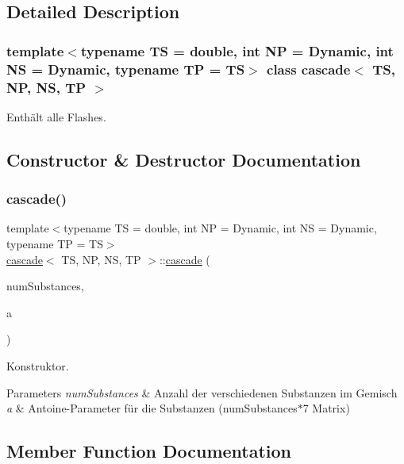 \subsection{Detailed Description}
\subsubsection*{template$<$typename TS = double, int NP = Dynamic, int NS = Dynamic, typename TP = TS$>$\newline
class cascade$<$ T\+S, N\+P, N\+S, T\+P $>$}

Enthält alle Flashes. 

\subsection{Constructor \& Destructor Documentation}
\mbox{\label{classcascade_a9775f4c242df052cfb9c0c8a095a2964}} 
\subsubsection{\texorpdfstring{cascade()}{cascade()}}
{\footnotesize\ttfamily template$<$typename TS = double, int NP = Dynamic, int NS = Dynamic, typename TP = TS$>$ \\
\mbox{\hyperlink{classcascade}{cascade}}$<$ TS, NP, NS, TP $>$\+::\mbox{\hyperlink{classcascade}{cascade}} (\begin{DoxyParamCaption}\item[{int}]{num\+Substances,  }\item[{Matrix$<$ TS, Dynamic, 7 $>$}]{a }\end{DoxyParamCaption})\hspace{0.3cm}{\ttfamily [inline]}}



Konstruktor. 


\begin{DoxyParams}{Parameters}
{\em num\+Substances} & Anzahl der verschiedenen Substanzen im Gemisch \\
\hline
{\em a} & Antoine-\/\+Parameter für die Substanzen (num\+Substances$\ast$7 Matrix) \\
\hline
\end{DoxyParams}


\subsection{Member Function Documentation}
\mbox{\label{classcascade_ae1aae44e18b9d87cb710c54726726baa}} 
